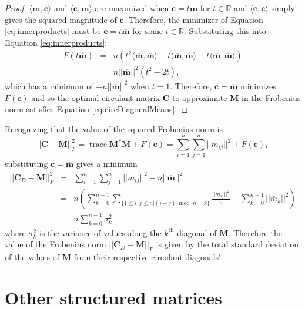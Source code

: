 \documentclass[letterpaper,12pt,oneside,final]{article}
\newcommand{\ve}[1]{\mathbf{#1}}           %
\newcommand{\m}[1]{\mathbf{#1}}               %
\newcommand{\conj}[1]{{#1}^{\ast}}
\newcommand{\norm}[1]{||{#1}||}              %
\newcommand{\frob}[1]{\norm{#1}_F}
\newcommand*{\trace}{\operatorname{trace}}
\newcommand{\widebar}[1]{\overline{#1}}
\newcommand{\field}[1]{\mathbb{#1}}
\newcommand{\Reals}{\field{R}}
\begin{document}
\begin{proof}
  $\langle \widebar{\ve{m}}, \ve{c} \rangle$ and $\langle \ve{c}, \widebar{\ve{m}} \rangle$ are maximized when $\ve{c} = t \widebar{\ve{m}}$ for $t \in \Reals$ and $\langle \ve{c}, \ve{c} \rangle$ simply gives the squared magnitude of $\ve{c}$. Therefore, the minimizer of Equation \ref{eq:innerproducts} must be $\ve{c} = t \widebar{\ve{m}}$ for some $t \in \Reals$. Substituting this into Equation \ref{eq:innerproducts}:
  \begin{eqnarray}
    F(t \widebar{\ve{m}}) & = & n \left ( t^2 \langle \widebar{\ve{m}}, \widebar{\ve{m}} \rangle - t \langle \widebar{\ve{m}}, \widebar{\ve{m}} \rangle - t \langle \widebar{\ve{m}}, \widebar{\ve{m}} \rangle \right ) \nonumber \\
    & = & n \norm{ \widebar{ \ve{m} } }^2 (t^2 - 2t),
  \end{eqnarray}
  which has a minimum of $-n \norm{ \widebar{ \ve{m} } }^2$ when $t = 1$. Therefore, $\ve{c} = \widebar{\ve{m}}$ minimizes $F(\ve{c})$ and so the optimal circulant matrix $\m{C}$ to approximate $\m{M}$ in the Frobenius norm satisfies Equation \ref{eq:circDiagonalMeans}.
\end{proof}

Recognizing that the value of the squared Frobenius norm is
$$\frob{\m{C} - \m{M}}^2 = \trace \conj{\m{M}} \m{M} + F(\ve{c}) = \sum_{i = 1}^n \sum_{j = 1}^n \norm{m_{ij}}^2 + F(\ve{c}),$$
substituting $\ve{c} = \widebar{ \ve{m} }$ gives a minimum
\begin{eqnarray} 
  \frob{\m{C}_D - \m{M}}^2 & = & \sum_{i = 1}^n \sum_{j = 1}^n \norm{m_{ij}}^2 - n \norm{ \widebar { \ve{m} } }^2 \nonumber \\
  & = & n \left ( \sum_{k = 0}^{n-1} \sum_{\{1 \leq i,j \leq n|(i-j) \bmod n = k\}} \frac{\norm{m_{ij}}^2}{n} - \sum_{k = 0}^{n-1} \norm{ \widebar{ m }_k }^2 \right ) \nonumber \\
  & = & n \sum_{k = 0}^{n-1} \sigma^2_k \label{eq:varianceMinimum}
\end{eqnarray}
where $\sigma^2_k$ is the variance of values along the $k^{\text{th}}$ diagonal of $\m{M}$. Therefore the value of the Frobenius norm $\frob{\m{C}_D - \m{M}}$ is given by the total standard deviation of the values of $\m{M}$ from their respective circulant diagonals!

\section{Other structured matrices}
\end{document}
